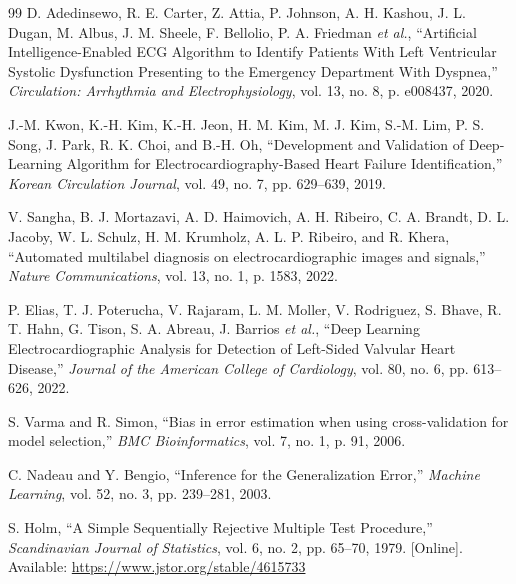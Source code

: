 \begin{thebibliography}{99}
 D. Adedinsewo, R. E. Carter, Z. Attia, P. Johnson, A. H. Kashou, J. L. Dugan, M. Albus, J. M. Sheele, F. Bellolio, P. A. Friedman \emph{et al.}, ``Artificial Intelligence-Enabled ECG Algorithm to Identify Patients With Left Ventricular Systolic Dysfunction Presenting to the Emergency Department With Dyspnea,'' \emph{Circulation: Arrhythmia and Electrophysiology}, vol. 13, no. 8, p. e008437, 2020.

 J.-M. Kwon, K.-H. Kim, K.-H. Jeon, H. M. Kim, M. J. Kim, S.-M. Lim, P. S. Song, J. Park, R. K. Choi, and B.-H. Oh, ``Development and Validation of Deep-Learning Algorithm for Electrocardiography-Based Heart Failure Identification,'' \emph{Korean Circulation Journal}, vol. 49, no. 7, pp. 629--639, 2019.

 V. Sangha, B. J. Mortazavi, A. D. Haimovich, A. H. Ribeiro, C. A. Brandt, D. L. Jacoby, W. L. Schulz, H. M. Krumholz, A. L. P. Ribeiro, and R. Khera, ``Automated multilabel diagnosis on electrocardiographic images and signals,'' \emph{Nature Communications}, vol. 13, no. 1, p. 1583, 2022.

 P. Elias, T. J. Poterucha, V. Rajaram, L. M. Moller, V. Rodriguez, S. Bhave, R. T. Hahn, G. Tison, S. A. Abreau, J. Barrios \emph{et al.}, ``Deep Learning Electrocardiographic Analysis for Detection of Left-Sided Valvular Heart Disease,'' \emph{Journal of the American College of Cardiology}, vol. 80, no. 6, pp. 613--626, 2022.

 S. Varma and R. Simon, ``Bias in error estimation when using cross-validation for model selection,'' \emph{BMC Bioinformatics}, vol. 7, no. 1, p. 91, 2006.

 C. Nadeau and Y. Bengio, ``Inference for the Generalization Error,'' \emph{Machine Learning}, vol. 52, no. 3, pp. 239--281, 2003.

 S. Holm, ``A Simple Sequentially Rejective Multiple Test Procedure,'' \emph{Scandinavian Journal of} \emph{Statistics}, vol. 6, no. 2, pp. 65--70, 1979. [Online]. Available: \url{https://www.jstor.org/stable/4615733}

\end{thebibliography}
